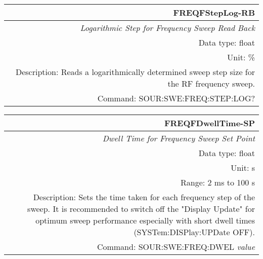 \documentclass[openany]{article}
\begin{document}
		\begin{tabular}{N}
			\hline
			\bfseries FREQFStepLog-RB \\ \hline
			\emph{Logarithmic Step for Frequency Sweep Read Back} \\
			Data type: float \\
			Unit: \% \\
			Description: Reads a logarithmically determined sweep step size for the RF frequency sweep. \\
			Command: SOUR:SWE:FREQ:STEP:LOG? \\

		\end{tabular}
%
		\begin{tabular}{N}
			\hline
			\bfseries FREQFDwellTime-SP \\ \hline
			\emph{Dwell Time for Frequency Sweep Set Point} \\
			Data type: float \\
			Unit: s \\
			Range: 2 ms to 100 s \\
			Description: Sets the time taken for each frequency step of the sweep. It is recommended to switch off the "Display Update" for optimum sweep performance especially with short dwell times (SYSTem:DISPlay:UPDate OFF). \\
			Command: SOUR:SWE:FREQ:DWEL \emph{value} \\
			
		\end{tabular}
\end{document}
